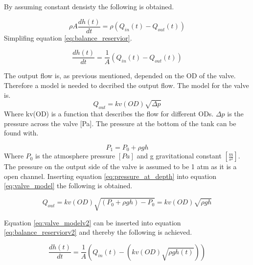 By assuming constant densisty the following is obtained.

\begin{equation}\label{eq:balance_reservior}
	\rho A\frac{dh(t)}{dt}=\rho \left(Q_{in}(t)-Q_{out}(t)\right)
\end{equation}
Simplifing equation \ref{eq:balance_reservior}.

\begin{equation}\label{eq:balance_reserviorv2}
	\frac{dh(t)}{dt}=\frac{1}{A} \left(Q_{in}(t)-Q_{out}(t)\right)
\end{equation}

The output flow is, as previous mentioned, depended on the OD of the valve. Therefore a model is needed to decribed the output flow. The model for the valve is.
\begin{equation}\label{eq:valve_model}
	Q_{out} = kv(OD) \sqrt{\Delta p}
\end{equation}
Where kv(OD) is a function that describes the flow for different ODs. $\Delta p$ is the pressure across the valve [Pa]. The pressure at the bottom of the tank can be found with.

\begin{equation}\label{eq:pressure_at_depth}
 	P_1 = P_0 +\rho g h
 \end{equation} 
 Where $P_0$ is the atmosphere pressure $[Pa]$ and g gravitational constant $\left[\frac{m}{s^2}\right]$. The pressure on the output side of the valve is assumed to be 1 atm as it is a open channel. Inserting equation \ref{eq:pressure_at_depth} into equation \ref{eq:valve_model} the following is obtained.    


\begin{equation}\label{eq:valve_modelv2}
	Q_{out} = kv(OD) \sqrt{(P_0 +\rho g h)- P_0} = kv(OD) \sqrt{\rho g h} 
\end{equation}

Equation \ref{eq:valve_modelv2} can be inserted into equation \ref{eq:balance_reserviorv2} and thereby the following is achieved.

\begin{equation}\label{eq:balance_reserviorv3}
	\frac{dh(t)}{dt}=\frac{1}{A} \left(Q_{in}(t)-\left(kv(OD) \sqrt{\rho g h(t)}\right)\right)
\end{equation}
